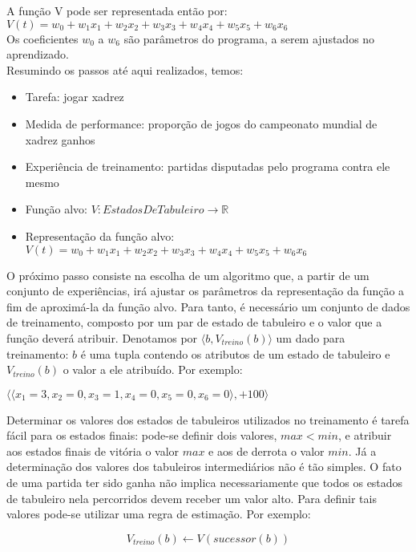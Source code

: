 A função V pode ser representada então por:
\\
$V(t) = w_0 + w_1 x_1 + w_2 x_2 + w_3 x_3 + w_4 x_4 + w_5 x_5 + w_6 x_6$
\\
Os coeficientes $w_0$ a $w_6$ são parâmetros do programa, a serem ajustados no aprendizado.
\\
Resumindo os passos até aqui realizados, temos:

\begin{itemize}
\item Tarefa: jogar xadrez
\item Medida de performance: proporção de jogos do campeonato mundial de xadrez ganhos
\item Experiência de treinamento: partidas disputadas pelo programa contra ele mesmo
\item Função alvo: $V:EstadosDeTabuleiro \rightarrow \mathbb{R}$
\item Representação da função alvo: $V(t) = w_0 + w_1 x_1 + w_2 x_2 + w_3 x_3 + w_4 x_4 + w_5 x_5 + w_6 x_6$
\end{itemize}


O próximo passo consiste na escolha de um algoritmo que, a partir de um conjunto de experiências, irá ajustar os parâmetros da representação da função a fim de aproximá-la da função alvo. Para tanto, é necessário um conjunto de dados de treinamento, composto por um par de estado de tabuleiro e o valor que a função deverá atribuir. Denotamos por $\langle b, V_{treino}(b) \rangle $ um dado para treinamento: $b$ é uma tupla contendo os atributos de um estado de tabuleiro e $V_{treino}(b)$ o valor a ele atribuído. Por exemplo:

$\langle \langle x_1 = 3, x_2 = 0, x_3 = 1, x_4 = 0, x_5 = 0, x_6 = 0 \rangle, +100\rangle$

Determinar os valores dos estados de tabuleiros utilizados no treinamento é tarefa fácil para os estados finais: pode-se definir dois valores, $max < min$, e atribuir aos estados finais de vitória o valor $max$ e aos de derrota o valor $min$. Já a determinação dos valores dos tabuleiros intermediários não é tão simples. O fato de uma partida ter sido ganha não implica necessariamente que todos os estados de tabuleiro nela percorridos devem receber um valor alto. Para definir tais valores pode-se utilizar uma regra de estimação. Por exemplo:

\begin{equation}
V_{treino}(b) \leftarrow V(sucessor(b))
\label{eq:critico}
\end{equation}

